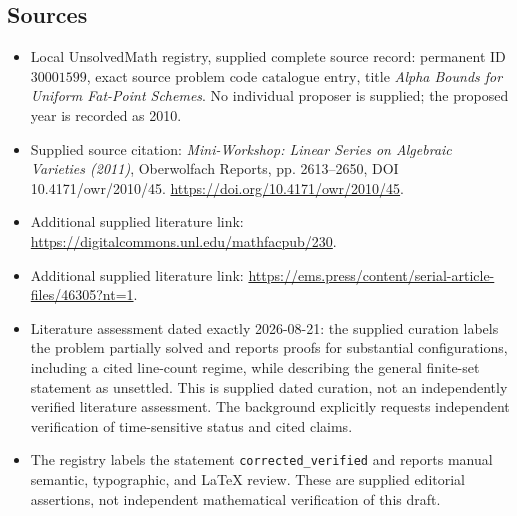 \documentclass[11pt]{article}
\begin{document}
\subsection{Sources}
\begin{itemize}
\item Local UnsolvedMath registry, supplied complete source record: permanent ID \(30001599\), exact source problem code \(\text{catalogue entry}\), title \emph{Alpha Bounds for Uniform Fat-Point Schemes}. No individual proposer is supplied; the proposed year is recorded as 2010.
\item Supplied source citation: \emph{Mini-Workshop: Linear Series on Algebraic Varieties (2011)}, Oberwolfach Reports, pp. 2613--2650, DOI 10.4171/owr/2010/45. \url{https://doi.org/10.4171/owr/2010/45}.
\item Additional supplied literature link: \url{https://digitalcommons.unl.edu/mathfacpub/230}.
\item Additional supplied literature link: \url{https://ems.press/content/serial-article-files/46305?nt=1}.
\item Literature assessment dated exactly 2026-08-21: the supplied curation labels the problem partially solved and reports proofs for substantial configurations, including a cited line-count regime, while describing the general finite-set statement as unsettled. This is supplied dated curation, not an independently verified literature assessment. The background explicitly requests independent verification of time-sensitive status and cited claims.
\item The registry labels the statement \texttt{corrected\_verified} and reports manual semantic, typographic, and LaTeX review. These are supplied editorial assertions, not independent mathematical verification of this draft.
\end{itemize}
\end{document}
